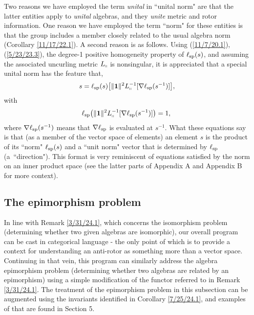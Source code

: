 \documentclass{amsart}
\numberwithin{equation}{section}
\theoremstyle{definition}
\numberwithin{theorem}{section}
\begin{document}
Two reasons we have employed the term {\it unital} in ``unital norm" are that the latter entities apply to {\it unital} algebras, and they {\it unite} metric and rotor information.  One reason we have employed the term ``norm" for these entities is that the group includes a member closely related to the usual algebra norm (Corollary \ref{11/17/22.1}).  A second reason is as follows.   Using (\ref{11/7/20.1}), (\ref{5/23/23.3}), the degree-1 positive homogeneity property of $\ell_{\rm sp}(s)$, and assuming the associated uncurling metric $L_{\shortparallel}$ is nonsingular, it is appreciated that a special unital norm has the feature that, 
\begin{equation}\label{5/22/24.5}  s = \ell_{\rm sp}(s)\big[\|\mathbf{1}\|^2 L_{\shortparallel}^{-1}[\nabla\ell_{\rm sp}(s^{-1})]\big],\end{equation} with
\begin{equation}\label{5/22/24.6}\ell_{\rm sp}\big(\|\mathbf{1}\|^2 L_{\shortparallel}^{-1}[\nabla\ell_{\rm sp}(s^{-1})]\big) = 1,\,\end{equation}
where $\nabla\ell_{\rm sp}(s^{-1})$ means that $\nabla\ell_{\rm sp}$ is evaluated at $s^{-1}$.  What these equations say is that (as a member of the vector space of elements) an element $s$ is the product of its ``norm" $\ell_{\rm sp}(s)$ and a ``unit norm" vector that is determined by $\ell_{\rm sp}$ (\mbox{a ``direction"}).  This format is very reminiscent of equations satisfied by the norm on an inner product space (see the latter parts of Appendix A and Appendix B for more context).

\subsection{The epimorphism problem}
 In line with Remark \ref{3/31/24.1}, which concerns the isomorphism problem (determining whether two given algebras are isomorphic), our overall program can be cast in categorical language - the only point of which is to provide a context for understanding an anti-rotor as something more than a vector space. 
Continuing in that vein, this program can similarly address the algebra epimorphism problem (determining whether two algebras are related by an epimorphism) using a simple modification of the functor referred to in Remark \ref{3/31/24.1}.  The treatment of the epimorphism problem in this subsection can be augmented using the invariants identified in Corollary \ref{7/25/24.1}, and examples of that are found in Section 5.  
\end{document}
